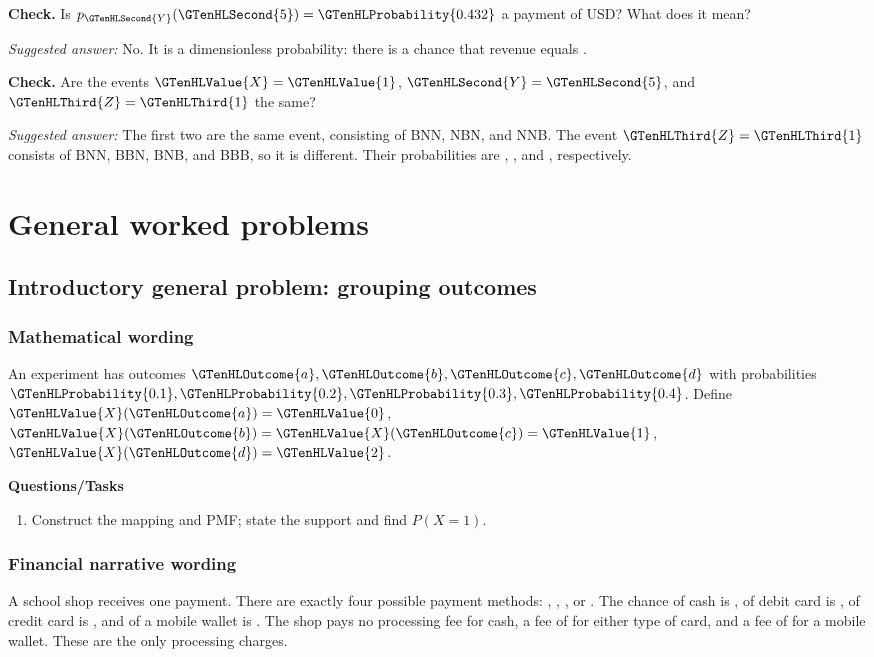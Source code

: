\textbf{Check.} Is $p_{\GTenHLSecond{Y}}(\GTenHLSecond{5})=\GTenHLProbability{0.432}$ a payment of  USD? What does it mean?

\emph{Suggested answer:} No. It is a dimensionless probability: there is a  chance that revenue equals .

\textbf{Check.} Are the events $\GTenHLValue{X}=\GTenHLValue{1}$, $\GTenHLSecond{Y}=\GTenHLSecond{5}$, and $\GTenHLThird{Z}=\GTenHLThird{1}$ the same?

\emph{Suggested answer:} The first two are the same event, consisting of BNN, NBN, and NNB. The event $\GTenHLThird{Z}=\GTenHLThird{1}$ consists of BNN, BBN, BNB, and BBB, so it is different. Their probabilities are , , and , respectively.


\section{General worked problems}
\subsection{Introductory general problem: grouping outcomes}
\subsubsection*{Mathematical wording}
An experiment has outcomes $\GTenHLOutcome{a},\GTenHLOutcome{b},\GTenHLOutcome{c},\GTenHLOutcome{d}$ with probabilities $\GTenHLProbability{0.1},\GTenHLProbability{0.2},\GTenHLProbability{0.3},\GTenHLProbability{0.4}$. Define $\GTenHLValue{X}(\GTenHLOutcome{a})=\GTenHLValue{0}$, $\GTenHLValue{X}(\GTenHLOutcome{b})=\GTenHLValue{X}(\GTenHLOutcome{c})=\GTenHLValue{1}$, $\GTenHLValue{X}(\GTenHLOutcome{d})=\GTenHLValue{2}$.

\textbf{Questions/Tasks}
\begin{enumerate}
\item Construct the mapping and PMF; state the support and find $P(X=1)$.
\end{enumerate}
\subsubsection*{Financial narrative wording}
A school shop receives one payment. There are exactly four possible payment methods: , , , or . The chance of cash is , of debit card is , of credit card is , and of a mobile wallet is . The shop pays no processing fee for cash, a fee of  for either type of card, and a fee of  for a mobile wallet. These are the only processing charges.

